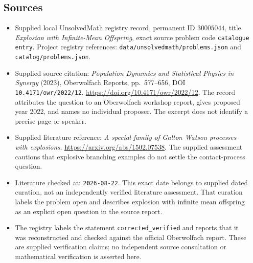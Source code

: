 \documentclass[11pt]{article}
\begin{document}
\subsection{Sources}
\begin{itemize}
\item Supplied local UnsolvedMath registry record, permanent ID \(30005044\), title \emph{Explosion with Infinite-Mean Offspring}, exact source problem code \texttt{catalogue entry}. Project registry references: \texttt{data/unsolvedmath/problems.json} and \texttt{catalog/problems.json}.
\item Supplied source citation: \emph{Population Dynamics and Statistical Physics in Synergy} (2023), Oberwolfach Reports, pp.~577--656, DOI \texttt{10.4171/owr/2022/12}. \url{https://doi.org/10.4171/owr/2022/12}. The record attributes the question to an Oberwolfach workshop report, gives proposed year 2022, and names no individual proposer. The excerpt does not identify a precise page or speaker.
\item Supplied literature reference: \emph{A special family of Galton Watson processes with explosions}. \url{https://arxiv.org/abs/1502.07538}. The supplied assessment cautions that explosive branching examples do not settle the contact-process question.
\item Literature checked at: \texttt{2026-08-22}. This exact date belongs to supplied dated curation, not an independently verified literature assessment. That curation labels the problem open and describes explosion with infinite mean offspring as an explicit open question in the source report.
\item The registry labels the statement \texttt{corrected\_verified} and reports that it was reconstructed and checked against the official Oberwolfach report. These are supplied verification claims; no independent source consultation or mathematical verification is asserted here.
\end{itemize}
\end{document}
